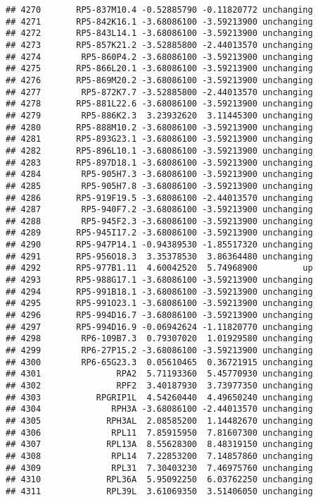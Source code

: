 \documentclass[]{article}
\begin{document}
\begin{verbatim}
## 4270       RP5-837M10.4 -0.52885790 -0.11820772 unchanging
## 4271       RP5-842K16.1 -3.68086100 -3.59213900 unchanging
## 4272       RP5-843L14.1 -3.68086100 -3.59213900 unchanging
## 4273       RP5-857K21.2 -3.52885800 -2.44013570 unchanging
## 4274        RP5-860P4.2 -3.68086100 -3.59213900 unchanging
## 4275       RP5-866L20.1 -3.68086100 -3.59213900 unchanging
## 4276       RP5-869M20.2 -3.68086100 -3.59213900 unchanging
## 4277        RP5-872K7.7 -3.52885800 -2.44013570 unchanging
## 4278       RP5-881L22.6 -3.68086100 -3.59213900 unchanging
## 4279        RP5-886K2.3  3.23932620  3.11445300 unchanging
## 4280       RP5-888M10.2 -3.68086100 -3.59213900 unchanging
## 4281       RP5-893G23.1 -3.68086100 -3.59213900 unchanging
## 4282       RP5-896L10.1 -3.68086100 -3.59213900 unchanging
## 4283       RP5-897D18.1 -3.68086100 -3.59213900 unchanging
## 4284        RP5-905H7.3 -3.68086100 -3.59213900 unchanging
## 4285        RP5-905H7.8 -3.68086100 -3.59213900 unchanging
## 4286       RP5-919F19.5 -3.68086100 -2.44013570 unchanging
## 4287        RP5-940F7.2 -3.68086100 -3.59213900 unchanging
## 4288        RP5-945F2.3 -3.68086100 -3.59213900 unchanging
## 4289       RP5-945I17.2 -3.68086100 -3.59213900 unchanging
## 4290       RP5-947P14.1 -0.94389530 -1.85517320 unchanging
## 4291       RP5-956O18.3  3.35378530  3.86364480 unchanging
## 4292       RP5-977B1.11  4.60042520  5.74968900         up
## 4293       RP5-988G17.1 -3.68086100 -3.59213900 unchanging
## 4294       RP5-991B18.1 -3.68086100 -3.59213900 unchanging
## 4295       RP5-991O23.1 -3.68086100 -3.59213900 unchanging
## 4296       RP5-994D16.7 -3.68086100 -3.59213900 unchanging
## 4297       RP5-994D16.9 -0.06942624 -1.11820770 unchanging
## 4298        RP6-109B7.3  0.79307020  1.01929580 unchanging
## 4299        RP6-27P15.2 -3.68086100 -3.59213900 unchanging
## 4300        RP6-65G23.3  0.05610465  0.36721915 unchanging
## 4301               RPA2  5.71193360  5.45770930 unchanging
## 4302               RPF2  3.40187930  3.73977350 unchanging
## 4303           RPGRIP1L  4.54260440  4.49650240 unchanging
## 4304              RPH3A -3.68086100 -2.44013570 unchanging
## 4305             RPH3AL  2.08585200  1.14482670 unchanging
## 4306              RPL11  7.85915950  7.81607300 unchanging
## 4307             RPL13A  8.55628300  8.48319150 unchanging
## 4308              RPL14  7.22853200  7.14857860 unchanging
## 4309              RPL31  7.30403230  7.46975760 unchanging
## 4310             RPL36A  5.95092250  6.03762250 unchanging
## 4311             RPL39L  3.61069350  3.51406050 unchanging

\end{verbatim}
\end{document}
